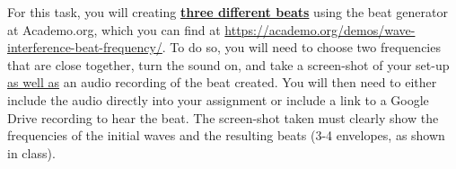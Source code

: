 \documentclass[12pt,oneside]{article}
\begin{document}

\newpage

\begin{tcolorbox}[breakable, enhanced, colframe=blue!25,
colback=white!10,
coltitle=blue!20!black,  
title= {\bf Task 3: Drop a Beat!}] 
For this task, you will creating \underline{\bf three different beats} using the beat generator at Academo.org, which you can find at \url{https://academo.org/demos/wave-interference-beat-frequency/}. To do so, you will need to choose two frequencies that are close together, turn the sound on, and take a screen-shot of your set-up \underline{as well as} an audio recording of the beat created. You will then need to either include the audio directly into your assignment or include a link to a Google Drive recording to hear the beat. The screen-shot taken must clearly show the frequencies of the initial waves and the resulting beats (3-4 envelopes, as shown in class). 
\end{tcolorbox}





\end{document}
